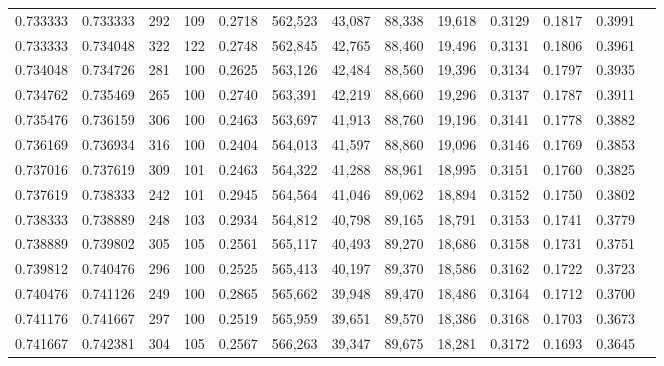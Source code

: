 \begin{tabular}{rrrrrrrrrrrrr}
0.733333 & 0.733333 &    292 &   109 &                                     0.2718 & 562,523 &  43,087 &  88,338 &  19,618 & 0.3129 & 0.1817 & 0.3991 \\
0.733333 & 0.734048 &    322 &   122 &                                     0.2748 & 562,845 &  42,765 &  88,460 &  19,496 & 0.3131 & 0.1806 & 0.3961 \\
0.734048 & 0.734726 &    281 &   100 &                                     0.2625 & 563,126 &  42,484 &  88,560 &  19,396 & 0.3134 & 0.1797 & 0.3935 \\
0.734762 & 0.735469 &    265 &   100 &                                     0.2740 & 563,391 &  42,219 &  88,660 &  19,296 & 0.3137 & 0.1787 & 0.3911 \\
0.735476 & 0.736159 &    306 &   100 &                                     0.2463 & 563,697 &  41,913 &  88,760 &  19,196 & 0.3141 & 0.1778 & 0.3882 \\
0.736169 & 0.736934 &    316 &   100 &                                     0.2404 & 564,013 &  41,597 &  88,860 &  19,096 & 0.3146 & 0.1769 & 0.3853 \\
0.737016 & 0.737619 &    309 &   101 &                                     0.2463 & 564,322 &  41,288 &  88,961 &  18,995 & 0.3151 & 0.1760 & 0.3825 \\
0.737619 & 0.738333 &    242 &   101 &                                     0.2945 & 564,564 &  41,046 &  89,062 &  18,894 & 0.3152 & 0.1750 & 0.3802 \\
0.738333 & 0.738889 &    248 &   103 &                                     0.2934 & 564,812 &  40,798 &  89,165 &  18,791 & 0.3153 & 0.1741 & 0.3779 \\
0.738889 & 0.739802 &    305 &   105 &                                     0.2561 & 565,117 &  40,493 &  89,270 &  18,686 & 0.3158 & 0.1731 & 0.3751 \\
0.739812 & 0.740476 &    296 &   100 &                                     0.2525 & 565,413 &  40,197 &  89,370 &  18,586 & 0.3162 & 0.1722 & 0.3723 \\
0.740476 & 0.741126 &    249 &   100 &                                     0.2865 & 565,662 &  39,948 &  89,470 &  18,486 & 0.3164 & 0.1712 & 0.3700 \\
0.741176 & 0.741667 &    297 &   100 &                                     0.2519 & 565,959 &  39,651 &  89,570 &  18,386 & 0.3168 & 0.1703 & 0.3673 \\
0.741667 & 0.742381 &    304 &   105 &                                     0.2567 & 566,263 &  39,347 &  89,675 &  18,281 & 0.3172 & 0.1693 & 0.3645 \\

\end{tabular}
